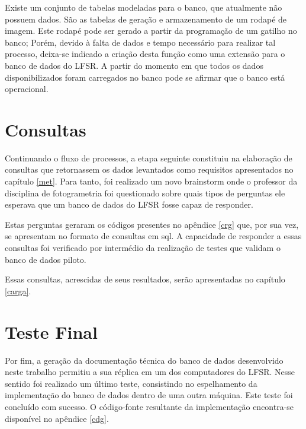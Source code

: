 Existe um conjunto de tabelas modeladas para o banco, que atualmente não possuem dados. São as tabelas de geração e armazenamento de um rodapé de imagem. Este rodapé pode ser gerado a partir da programação de um gatilho no banco; Porém, devido à falta de dados e tempo necessário para realizar tal processo, deixa-se indicado a criação desta função como uma extensão para o banco de dados do LFSR. 
A partir do momento em que todos os dados disponibilizados foram carregados no banco pode se afirmar que o banco está operacional.

\section{Consultas}

Continuando o fluxo de processos, a etapa seguinte constituiu na elaboração de consultas que retornassem os dados levantados como requisitos apresentados no capítulo \ref{met}. Para tanto, foi realizado um novo brainstorm onde o professor da disciplina de fotogrametria foi questionado sobre quais tipos de perguntas ele esperava que um banco de dados do LFSR fosse capaz de responder.

Estas perguntas geraram os códigos presentes no apêndice \ref{crg} que, por sua vez, se apresentam no formato de consultas em sql. A capacidade de responder a essas consultas foi verificado por intermédio da realização de testes que validam o banco de dados piloto.

Essas consultas, acrescidas de seus resultados, serão apresentadas no capítulo \ref{carga}.

\section{Teste Final}\label{testefinal}

Por fim, a geração da documentação técnica do banco de dados desenvolvido neste trabalho permitiu a sua réplica em um dos computadores do LFSR. Nesse sentido foi realizado um último teste, consistindo no espelhamento da implementação do banco de dados dentro de uma outra máquina. Este teste foi concluído com sucesso. O código-fonte resultante da implementação encontra-se disponível no apêndice \ref{cdg}.


